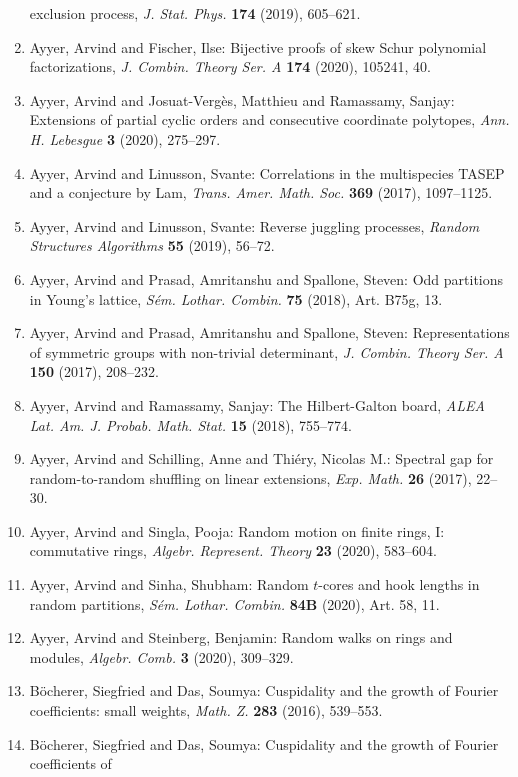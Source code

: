 \begin{enumerate}
exclusion process, \emph{J. Stat. Phys.} {\bf 174} (2019), 605--621.
\item Ayyer, Arvind and Fischer, Ilse: Bijective proofs of skew {S}chur polynomial factorizations, \emph{J. Combin. Theory Ser. A} {\bf 174} (2020), 105241, 40.
\item Ayyer, Arvind and Josuat-Verg\`es, Matthieu and Ramassamy,
Sanjay: Extensions of partial cyclic orders and consecutive coordinate
polytopes, \emph{Ann. H. Lebesgue} {\bf 3} (2020), 275--297.
\item Ayyer, Arvind and Linusson, Svante: Correlations in the multispecies {TASEP} and a conjecture by
{L}am, \emph{Trans. Amer. Math. Soc.} {\bf 369} (2017), 1097--1125.
\item Ayyer, Arvind and Linusson, Svante: Reverse juggling processes, \emph{Random Structures Algorithms} {\bf 55} (2019), 56--72.
\item Ayyer, Arvind and Prasad, Amritanshu and Spallone, Steven: Odd partitions in {Y}oung's lattice, \emph{S\'{e}m. Lothar. Combin.} {\bf 75} (2018), Art. B75g, 13.
\item Ayyer, Arvind and Prasad, Amritanshu and Spallone, Steven: Representations of symmetric groups with non-trivial
determinant, \emph{J. Combin. Theory Ser. A} {\bf 150} (2017), 208--232.
\item Ayyer, Arvind and Ramassamy, Sanjay: The {H}ilbert-{G}alton board, \emph{ALEA Lat. Am. J. Probab. Math. Stat.} {\bf 15} (2018), 755--774.
\item Ayyer, Arvind and Schilling, Anne and Thi\'{e}ry, Nicolas M.: Spectral gap for random-to-random shuffling on linear
extensions, \emph{Exp. Math.} {\bf 26} (2017), 22--30.
\item Ayyer, Arvind and Singla, Pooja: Random motion on finite rings, {I}: commutative rings, \emph{Algebr. Represent. Theory} {\bf 23} (2020), 583--604.
\item Ayyer, Arvind and Sinha, Shubham: Random {$t$}-cores and hook lengths in random partitions, \emph{S\'{e}m. Lothar. Combin.} {\bf 84B} (2020), Art. 58, 11.
\item Ayyer, Arvind and Steinberg, Benjamin: Random walks on rings and modules, \emph{Algebr. Comb.} {\bf 3} (2020), 309--329.
\item B\"{o}cherer, Siegfried and Das, Soumya: Cuspidality and the growth of {F}ourier coefficients: small
weights, \emph{Math. Z.} {\bf 283} (2016), 539--553.
\item B\"{o}cherer, Siegfried and Das, Soumya: Cuspidality and the growth of {F}ourier coefficients of

\end{enumerate}
